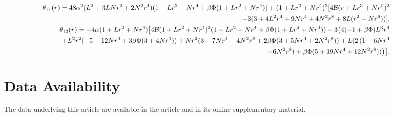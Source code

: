 \documentclass[]{aastex631}
\begin{document}
\begin{eqnarray}
&& \hspace{-0.4cm} \theta_{11}(r)=48 \alpha^2 (L^2 + 3 L N r^2 + 2 N^2 r^4) (1 - L r^2 - N r^4 + \beta \Phi (1  + L r^2 + N r^4)) + (1 + L r^2 + N r^4)^2 [4 \mathcal{B} (r + L r^3 + N r^5)^2 \nonumber\\&& \hspace{0.9cm} - 
    3 (3 + 4 L^2 r^4 + 9 N r^4 + 4 N^2 r^8 + 8 L (r^2 + N r^6))],\nonumber \\ 
&& \hspace{-0.4cm} \theta_{12}(r)=   
    -  4 \alpha (1 + L r^2 +  N r^4) \big[4 \mathcal{B} (1 + L r^2 + N r^4)^2 (1 - L r^2  - N r^4 +  \beta \Phi (1 + L r^2 + N r^4)) - 
    3 \big(4 (-1 + \beta \Phi) L^3 r^4  \nonumber\\&& \hspace{0.9cm} + 
       L^2 r^2 (-5 - 12 N r^4 + 3 \beta \Phi (3 + 4 N r^4)) + 
       N r^2 (3 - 7 N r^4 - 4 N^2 r^8 + 2 \beta \Phi (3 + 5 N r^4 + 2 N^2 r^8)) +  L (2\,(1 - 6 N r^4 \nonumber\\&& \hspace{0.9cm} - 6 N^2 r^8) + \beta \Phi (5 + 19 N r^4 + 12 N^2 r^8))\big)\big].\nonumber 
\end{eqnarray}

\section*{Data Availability}
The data underlying this article are available in the article and in its online supplementary material.

\end{document}
